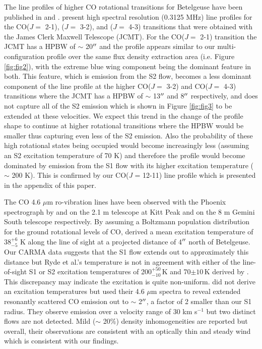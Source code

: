 \documentclass[iop]{emulateapj}
\begin{document}
The line profiles of higher CO rotational transitions for Betelgeuse have been published in \cite{2003A&A...407..609K} and \cite{2010A&A...523A..18D}. \cite{2010A&A...523A..18D} present high spectral resolution (0.3125 MHz) line profiles for the CO($J=$ 2-1), ($J=$ 3-2), and ($J=$ 4-3) transitions that were obtained with the James Clerk Maxwell Telescope (JCMT). For the CO($J=$ 2-1) transition the JCMT has a HPBW of $\sim$ 20$\mbox{$^{\prime\prime}$}$ and the profile appears similar to our multi-configuration profile over the same flux density extraction area (i.e. Figure \ref{fig:fig2}), with the extreme blue wing component being the dominant feature in both. This feature, which is emission from the S2 flow, becomes a less dominant component of the line profile at the higher CO($J=$ 3-2) and CO($J=$ 4-3) transitions where the JCMT has a HPBW of $\sim$ 13$\mbox{$^{\prime\prime}$}$ and 8$\mbox{$^{\prime\prime}$}$ respectively, and does not capture all of the S2 emission which is shown in Figure \ref{fig:fig3} to be extended at these velocities. We expect this trend in the change of the profile shape to continue at higher rotational transitions where the HPBW would be smaller thus capturing even less of the S2 emission. Also the probability of these high rotational states being occupied would become increasingly less (assuming an S2 excitation temperature of 70 K) and therefore the profile would become dominated by emission from the S1 flow with its higher excitation temperature ($\sim$ 200 K). This is confirmed by our CO(\textit{J} = 12-11) line profile which is presented in the appendix of this paper.

The CO 4.6 $\mu$m ro-vibration lines have been observed with the Phoenix spectrograph \citep{1998SPIE.3354..810H} by \cite{1999A&A...347L..35R} and \cite{2009AJ....137.3558S} on the 2.1 m telescope at Kitt Peak and on the 8 m Gemini South telescope respectively. By assuming a Boltzmann population distribution for the ground rotational levels of CO, \cite{1999A&A...347L..35R}  derived a mean excitation temperature of 38${}^{+6}_{-5}$ K along the line of sight at a projected distance of 4$\mbox{$^{\prime\prime}$}$ north of Betelgeuse. Our CARMA data suggests that the S1 flow extends out to approximately this distance but Ryde et al.'s temperature is not in agreement with either of the line-of-sight S1 or S2 excitation temperatures of 200${}^{+50}_{-10}$\,K and 70$\pm 10$\,K derived by \cite{1979ApJ...233L.135B}. This discrepancy may indicate the excitation is quite non-uniform.
\cite{2009AJ....137.3558S} did not derive an excitation temperatures but used their 4.6 $\mu$m spectra to reveal extended resonantly scattered CO emission out to $\sim$ 2$\mbox{$^{\prime\prime}$}$, a factor of 2 smaller than our S1 radius. They observe emission over a velocity range of 30 km s${}^{-1}$ but two distinct flows are not detected. Mild ($\sim$ 20\%) density inhomogeneities are reported but overall, their observations are consistent with an optically thin and steady wind which is consistent with our findings.
\end{document}
